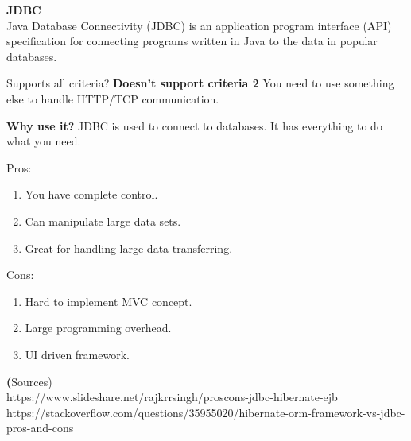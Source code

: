 		\textbf{JDBC} \\
		Java Database Connectivity (JDBC) is an application program interface (API) specification for connecting programs written in Java to the data in popular databases.
		
		Supports all criteria?
		\textbf{Doesn't support criteria 2}
		You need to use something else to handle HTTP/TCP communication.
		
		\textbf{Why use it?}
		JDBC is used to connect to databases. It has everything to do what you need.
		
		Pros:
		\begin{enumerate}
			\item You have complete control.
			\item Can manipulate large data sets.
			\item Great for handling large data transferring.
		\end{enumerate}
		Cons:
		\begin{enumerate}
			\item Hard to implement MVC concept.
			\item Large programming overhead.
			\item UI driven framework.
		\end{enumerate}
	
	\textbf(Sources)\\
	https://www.slideshare.net/rajkrrsingh/proscons-jdbc-hibernate-ejb \\
	https://stackoverflow.com/questions/35955020/hibernate-orm-framework-vs-jdbc-pros-and-cons \\